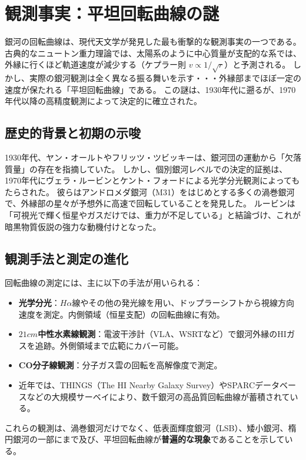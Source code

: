 \documentclass[dvipdfmx,a4paper]{jsbook}
\theoremstyle{definition}
\theoremstyle{remark}
\begin{document}
\section{観測事実：平坦回転曲線の謎}
\label{sec:observed-flat-curves}

銀河の回転曲線は、現代天文学が発見した最も衝撃的な観測事実の一つである。  
古典的なニュートン重力理論では、太陽系のように中心質量が支配的な系では、外縁に行くほど軌道速度が減少する（ケプラー則 $v \propto 1/\sqrt{r}$）と予測される。  
しかし、実際の銀河観測は全く異なる振る舞いを示す・・・外縁部までほぼ一定の速度が保たれる「平坦回転曲線」である。  
この謎は、1930年代に遡るが、1970年代以降の高精度観測によって決定的に確立された。

\subsection{歴史的背景と初期の示唆}

1930年代、ヤン・オールトやフリッツ・ツビッキーは、銀河団の運動から「欠落質量」の存在を指摘していた。  
しかし、個別銀河レベルでの決定的証拠は、1970年代にヴェラ・ルービンとケント・フォードによる光学分光観測によってもたらされた。  
彼らはアンドロメダ銀河（M31）をはじめとする多くの渦巻銀河で、外縁部の星々が予想外に高速で回転していることを発見した。  
ルービンは「可視光で輝く恒星やガスだけでは、重力が不足している」と結論づけ、これが暗黒物質仮説の強力な動機付けとなった。

\subsection{観測手法と測定の進化}

回転曲線の測定には、主に以下の手法が用いられる：
\begin{itemize}
  \item \textbf{光学分光}：$H\alpha$線やその他の発光線を用い、ドップラーシフトから視線方向速度を測定。内側領域（恒星支配）の回転曲線に有効。
  \item \textbf{$21cm$中性水素線観測}：電波干渉計（VLA、WSRTなど）で銀河外縁のHIガスを追跡。外側領域まで広範にカバー可能。
  \item \textbf{CO分子線観測}：分子ガス雲の回転を高解像度で測定。
  \item 近年では、THINGS（The HI Nearby Galaxy Survey）やSPARCデータベースなどの大規模サーベイにより、数千銀河の高品質回転曲線が蓄積されている。
\end{itemize}

これらの観測は、渦巻銀河だけでなく、低表面輝度銀河（LSB）、矮小銀河、楕円銀河の一部にまで及び、平坦回転曲線が\textbf{普遍的な現象}であることを示している。
\end{document}
